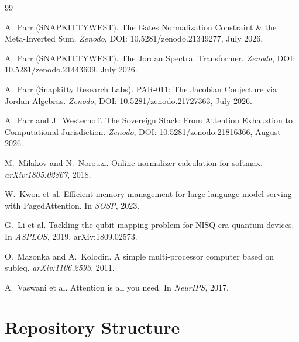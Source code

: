 \documentclass[11pt,a4paper]{article}
\begin{document}

\begin{thebibliography}{99}

A.~Parr (SNAPKITTYWEST).
\newblock The Gates Normalization Constraint \& the Meta-Inverted Sum.
\newblock \emph{Zenodo}, DOI: 10.5281/zenodo.21349277, July 2026.

A.~Parr (SNAPKITTYWEST).
\newblock The Jordan Spectral Transformer.
\newblock \emph{Zenodo}, DOI: 10.5281/zenodo.21443609, July 2026.

A.~Parr (Snapkitty Research Labs).
\newblock PAR-011: The Jacobian Conjecture via Jordan Algebras.
\newblock \emph{Zenodo}, DOI: 10.5281/zenodo.21727363, July 2026.

A.~Parr and J.~Westerhoff.
\newblock The Sovereign Stack: From Attention Exhaustion to Computational
  Jurisdiction.
\newblock \emph{Zenodo}, DOI: 10.5281/zenodo.21816366, August 2026.

M.~Milakov and N.~Norouzi.
\newblock Online normalizer calculation for softmax.
\newblock \emph{arXiv:1805.02867}, 2018.

W.~Kwon et al.
\newblock Efficient memory management for large language model serving with
  PagedAttention.
\newblock In \emph{SOSP}, 2023.

G.~Li et al.
\newblock Tackling the qubit mapping problem for NISQ-era quantum devices.
\newblock In \emph{ASPLOS}, 2019.
\newblock arXiv:1809.02573.

O.~Mazonka and A.~Kolodin.
\newblock A simple multi-processor computer based on subleq.
\newblock \emph{arXiv:1106.2593}, 2011.

A.~Vaswani et al.
\newblock Attention is all you need.
\newblock In \emph{NeurIPS}, 2017.

\end{thebibliography}

\appendix
\section{Repository Structure}
\end{document}
